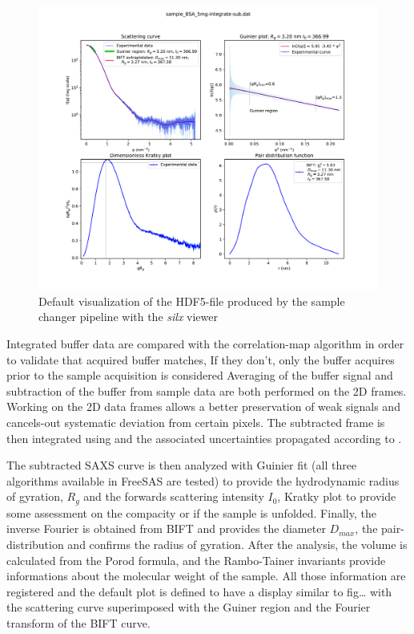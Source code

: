 \documentclass[preprint]{iucr}              %
\begin{document}
\begin{figure}
\label{subtracted}
\begin{center}
\includegraphics{Figure_1}
\caption{Default visualization of the HDF5-file produced by the sample changer pipeline with the \textit{silx} viewer}
\end{center}
\end{figure}


Integrated buffer data are compared with the correlation-map algorithm in order to validate that acquired buffer matches, 
If they don't, only the buffer acquires prior to the sample acquisition is considered
Averaging of the buffer signal and subtraction of the buffer from sample data are both performed on the 
2D frames. 
Working on the 2D data frames allows a better preservation of weak signals and cancels-out systematic deviation
from certain pixels.
The subtracted frame is then integrated using  and the associated uncertainties propagated according to \cite{pyfai_2020}.

The subtracted SAXS curve is then analyzed with Guinier fit (all three algorithms available in FreeSAS are tested)
to provide the hydrodynamic radius of gyration, $R_g$ and the forwards scattering intensity $I_0$, 
Kratky plot to provide some assessment on the compacity or if the sample is unfolded. 
Finally, the inverse Fourier is obtained from BIFT and provides the diameter $D_{max}$, the pair-distribution 
and confirms the radius of gyration.
After the analysis, the volume is calculated from the Porod formula, and the Rambo-Tainer invariants provide 
informations about the molecular weight of the sample.
All those information are registered and the default plot is defined to have a display similar to fig\ldots
with the scattering curve superimposed with the Guiner region and the Fourier transform of the BIFT curve.
\end{document}
